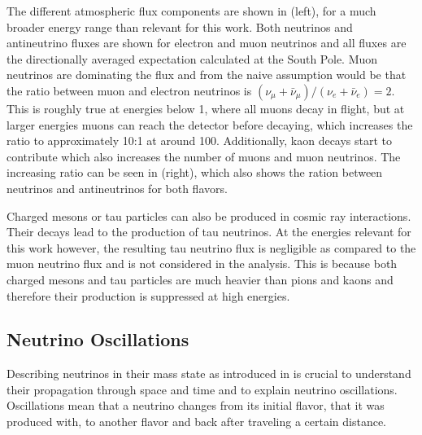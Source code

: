 The different atmospheric flux components are shown in  (left), for a much broader energy range than relevant for this work. Both neutrinos and antineutrino fluxes are shown for electron  and muon neutrinos and all fluxes are the directionally averaged expectation calculated at the South Pole. Muon neutrinos are dominating the flux and from  the naive assumption would be that the ratio between muon and electron neutrinos is $(\nu_\mu+\bar{\nu}_\mu)/(\nu_e+\bar{\nu}_e)=2$. This is roughly true at energies below \SI{1}{\gev}, where all muons decay in flight, but at larger energies muons can reach the detector before decaying, which increases the ratio to approximately 10:1 at around \SI{100}{\gev}. Additionally, kaon decays start to contribute which also increases the number of muons and muon neutrinos. The increasing ratio can be seen in  (right), which also shows the ration between neutrinos and antineutrinos for both flavors.

Charged mesons or tau particles can also be produced in cosmic ray interactions. Their decays lead to the production of tau neutrinos. At the energies relevant for this work however, the resulting tau neutrino flux is negligible as compared to the muon neutrino flux  and is not considered in the analysis. This is because both charged mesons and tau particles are much heavier than pions and kaons and therefore their production is suppressed at high energies.


\subsection{Neutrino Oscillations} 

Describing neutrinos in their mass state as introduced in  is crucial to understand their propagation through space and time and to explain neutrino oscillations. Oscillations mean that a neutrino changes from its initial flavor, that it was produced with, to another flavor and back after traveling a certain distance.

